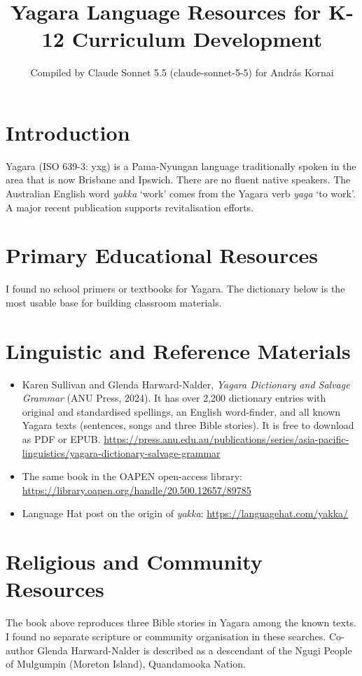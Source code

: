 \documentclass[12pt]{article}
\title{Yagara Language Resources for K-12 Curriculum Development}
\author{Compiled by Claude Sonnet 5.5 (claude-sonnet-5-5) for Andr\'as Kornai}
\date{}
\begin{document}
\maketitle

\section{Introduction}
Yagara (ISO 639-3: yxg) is a Pama-Nyungan language traditionally spoken in the area that is now Brisbane and Ipswich. There are no fluent native speakers. The Australian English word \emph{yakka} `work' comes from the Yagara verb \emph{yaga} `to work'. A major recent publication supports revitalisation efforts.

\section{Primary Educational Resources}
I found no school primers or textbooks for Yagara. The dictionary below is the most usable base for building classroom materials.

\section{Linguistic and Reference Materials}
\begin{itemize}
\item Karen Sullivan and Glenda Harward-Nalder, \emph{Yagara Dictionary and Salvage Grammar} (ANU Press, 2024). It has over 2,200 dictionary entries with original and standardised spellings, an English word-finder, and all known Yagara texts (sentences, songs and three Bible stories). It is free to download as PDF or EPUB. \url{https://press.anu.edu.au/publications/series/asia-pacific-linguistics/yagara-dictionary-salvage-grammar}
\item The same book in the OAPEN open-access library: \url{https://library.oapen.org/handle/20.500.12657/89785}
\item Language Hat post on the origin of \emph{yakka}: \url{https://languagehat.com/yakka/}
\end{itemize}

\section{Religious and Community Resources}
The book above reproduces three Bible stories in Yagara among the known texts. I found no separate scripture or community organisation in these searches. Co-author Glenda Harward-Nalder is described as a descendant of the Ngugi People of Mulgumpin (Moreton Island), Quandamooka Nation.
\end{document}
